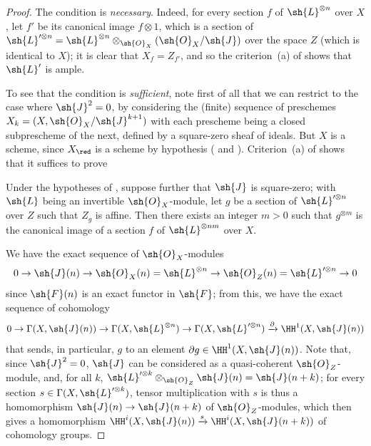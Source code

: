\begin{proof}
The condition is \emph{necessary}.
Indeed, for every section $f$ of $\sh{L}^{\otimes n}$ over $X$, let $f'$ be its canonical image $f\otimes1$, which is a section of $\sh{L}'^{\otimes n}=\sh{L}^{\otimes n}\otimes_{\sh{O}_X}(\sh{O}_X/\sh{J})$ over the space $Z$ (which is identical to $X$);
it is clear that $X_f=Z_{f'}$, and so the criterion~(a) of  shows that $\sh{L}'$ is ample.

To see that the condition is \emph{sufficient}, note first of all that we can restrict to the case where $\sh{J}^2=0$, by considering the (finite) sequence of preschemes $X_k=(X,\sh{O}_X/\sh{J}^{k+1})$ with each prescheme being a closed subprescheme of the next, defined by a square-zero sheaf of ideals.
But $X$ is a scheme, since $X_\red$ is a scheme by hypothesis ( and ).
Criterion~(a) of  shows that it suffices to prove
  \begin{lemma}[4.5.13.1]
  \label{II.4.5.13.1}
  Under the hypotheses of , suppose further that $\sh{J}$ is square-zero;
  with $\sh{L}$ being an invertible $\sh{O}_X$-module, let $g$ be a section of $\sh{L}'^{\otimes n}$ over $Z$ such that $Z_g$ is affine.
  Then there exists an integer $m>0$ such that $g^{\otimes m}$ is the canonical image of a section $f$ of $\sh{L}^{\otimes nm}$ over $X$.
  \end{lemma}

  We have the exact sequence of $\sh{O}_X$-modules
  \[
    0 \to \sh{J}(n) \to \sh{O}_X(n)=\sh{L}^{\otimes n} \to \sh{O}_Z(n)=\sh{L}'^{\otimes n} \to 0
  \]
  since $\sh{F}(n)$ is an exact functor in $\sh{F}$;
  from this, we have the exact sequence of cohomology
  \[
    0 \to \Gamma(X,\sh{J}(n)) \to \Gamma(X,\sh{L}^{\otimes n}) \to \Gamma(X,\sh{L}'^{\otimes n}) \xrightarrow{\partial} \HH^1(X,\sh{J}(n))
  \]
  that sends, in particular, $g$ to an element $\partial g\in\HH^1(X,\sh{J}(n))$.
  Note that, since $\sh{J}^2=0$, $\sh{J}$ can be considered as a quasi-coherent $\sh{O}_Z$-module, and, for all $k$, $\sh{L}'^{\otimes k}\otimes_{\sh{O}_Z}\sh{J}(n)=\sh{J}(n+k)$;
  for every section $s\in\Gamma(X,\sh{L}'^{\otimes k})$, tensor multiplication with $s$ is thus a homomorphism $\sh{J}(n)\to\sh{J}(n+k)$ of $\sh{O}_Z$-modules, which then gives a homomorphism $\HH^i(X,\sh{J}(n))\xrightarrow{s}\HH^i(X,\sh{J}(n+k))$ of cohomology groups.


\end{proof}
